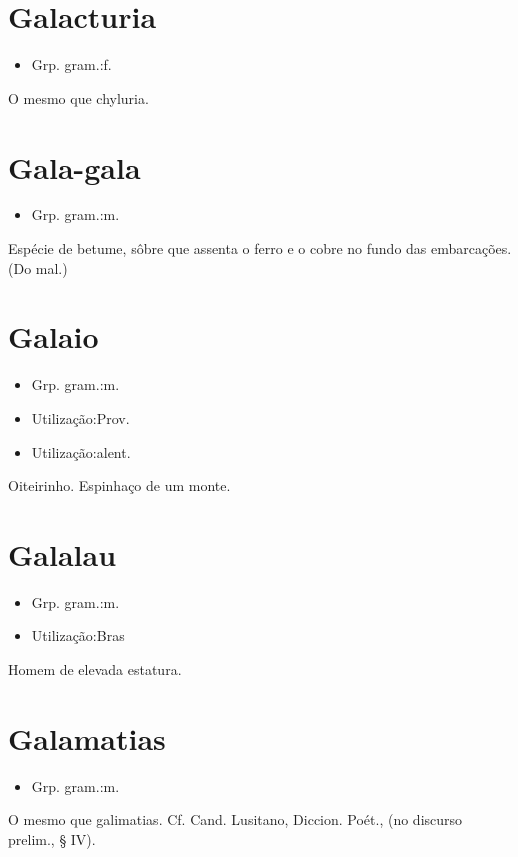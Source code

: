 \section{Galacturia}
\begin{itemize}
\item {Grp. gram.:f.}
\end{itemize}
O mesmo que \textunderscore chyluria\textunderscore .
\section{Gala-gala}
\begin{itemize}
\item {Grp. gram.:m.}
\end{itemize}
Espécie de betume, sôbre que assenta o ferro e o cobre no fundo das embarcações.
(Do mal.)
\section{Galaio}
\begin{itemize}
\item {Grp. gram.:m.}
\end{itemize}
\begin{itemize}
\item {Utilização:Prov.}
\end{itemize}
\begin{itemize}
\item {Utilização:alent.}
\end{itemize}
Oiteirinho.
Espinhaço de um monte.
\section{Galalau}
\begin{itemize}
\item {Grp. gram.:m.}
\end{itemize}
\begin{itemize}
\item {Utilização:Bras}
\end{itemize}
Homem de elevada estatura.
\section{Galamatias}
\begin{itemize}
\item {Grp. gram.:m.}
\end{itemize}
O mesmo que \textunderscore galimatias\textunderscore . Cf. Cand. Lusitano, \textunderscore Diccion. Poét.\textunderscore , (no discurso prelim., § IV).
